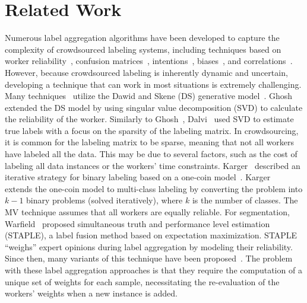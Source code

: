 \documentclass[default]{bst/sn-jnl_mine}%
\begin{document}
\section{Related Work}\label{sec:crowd.relatedwork}
Numerous label aggregation algorithms have been developed to capture the complexity of crowdsourced labeling systems, including techniques based on worker reliability~\cite{bi_Learning_2014,demartini_Zencrowd_2012}, confusion matrices~\cite{raykar_Learning_2010,zhang_Spectral_2014}, intentions~\cite{bi_Learning_2014,kurve_MultiCategory_2015}, biases~\cite{zhang_Imbalanced_2013,hernandez-gonzalez_Note_2019, welinder_Multidimensional_2010}, and correlations~\cite{ma_Gradient_2020}. However, because crowdsourced labeling is inherently dynamic and uncertain, developing a technique that can work in most situations is extremely challenging. Many techniques~\cite{liu_Variational_2012,karger_Budget_2014,raykar_Learning_2010,dalvi_Aggregating_2013,ghosh_Who_2011} utilize the Dawid and Skene (DS) generative model~\cite{dawid_Maximum_1979}. Ghosh~\cite{ghosh_Who_2011} extended the DS model by using singular value decomposition (SVD) to calculate the reliability of the worker. Similarly to Ghosh~\cite{ghosh_Who_2011}, Dalvi~\cite{dalvi_Aggregating_2013} used SVD to estimate true labels with a focus on the sparsity of the labeling matrix. In crowdsourcing, it is common for the labeling matrix to be sparse, meaning that not all workers have labeled all the data. This may be due to several factors, such as the cost of labeling all data instances or the workers' time constraints. Karger~\cite{karger_Budget_2014} described an iterative strategy for binary labeling based on a one-coin model~\cite{ghosh_Who_2011}. Karger~\cite{karger_Budget_2014} extends the one-coin model to multi-class labeling by converting the problem into $k-1 $ binary problems (solved iteratively), where $k $ is the number of classes.
The MV technique assumes that all workers are equally reliable. For segmentation, Warfield~\cite{warfield_Simultaneous_2004} proposed simultaneous truth and performance level estimation (STAPLE), a label fusion method based on expectation maximization. STAPLE ``weighs'' expert opinions during label aggregation by modeling their reliability. Since then, many variants of this technique have been proposed~\cite{winzeck_ISLES_2018,commowick_Objective_2018,asman_Robust_2011,asman_Formulating_2012, eugenioiglesias_Unified_2013, jorgecardoso_STEPS_2013,asman_NonLocal_2013,akhondi-asl_Logarithmic_2014}. The problem with these label aggregation approaches is that they require the computation of a unique set of weights for each sample, necessitating the re-evaluation of the workers' weights when a new instance is added.
\end{document}
